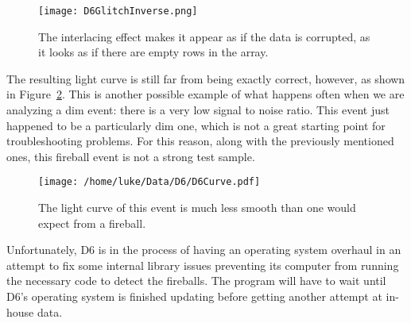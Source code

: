\begin{figure}[ht!]
	\centering
	\texttt{[image: D6GlitchInverse.png]}
	\caption{The interlacing effect makes it appear as if the data is corrupted, as it looks as if there are empty rows in the array.}
	\label{fig:D6Glitch}
\end{figure}

The resulting light curve is still far from being exactly correct, however, as shown in Figure~\ref{fig:D6LightCurve}. This is another possible example of what happens often when we are analyzing a dim event: there is a very low signal to noise ratio. This event just happened to be a particularly dim one, which is not a great starting point for troubleshooting problems. For this reason, along with the previously mentioned ones, this fireball event is not a strong test sample.

\begin{figure}[ht!]
	\centering
	\texttt{[image: /home/luke/Data/D6/D6Curve.pdf]}
	\caption{The light curve of this event is much less smooth than one would expect from a fireball.}
	\label{fig:D6LightCurve}
\end{figure}

Unfortunately, D6 is in the process of having an operating system overhaul in an attempt to fix some internal library issues preventing its computer from running the necessary code to detect the fireballs. The program will have to wait until D6's operating system is finished updating before getting another attempt at in-house data. 
